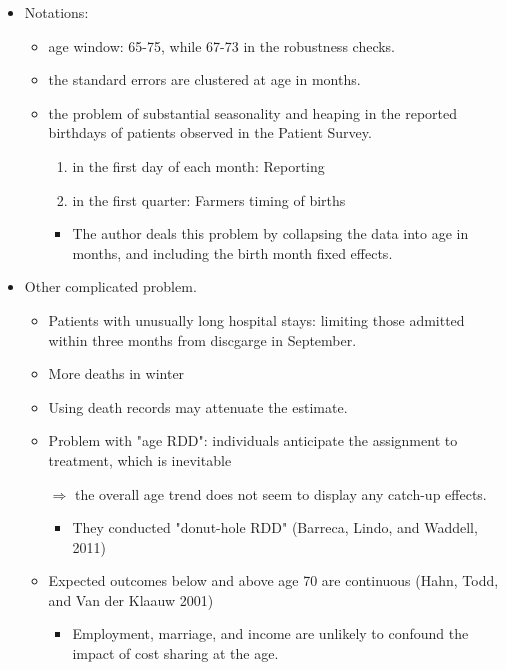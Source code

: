 \documentclass[../root]{subfiles}
\begin{document}
    \begin{itemize}
      \item Notations:
      \begin{itemize}
        \item age window: 65-75, while 67-73 in the robustness checks.
        \item the standard errors are clustered at age in months.
        \item the problem of substantial seasonality and heaping in the reported birthdays of patients observed in the Patient Survey.
        \begin{enumerate}
          \item in the first day of each month: Reporting
          \item in the first quarter: Farmers timing of births
        \end{enumerate}
        \begin{itemize}
          \item The author deals this problem by collapsing the data into age in months, and including the birth month fixed effects.
        \end{itemize}
      \end{itemize}
      \item Other complicated problem.
      \begin{itemize}
        \item Patients with unusually long hospital stays: limiting those admitted within three months from discgarge in September.
        \item More deaths in winter
        \item Using death records may attenuate the estimate.
        \item Problem with "age RDD": individuals anticipate the assignment to treatment, which is inevitable

        $\Rightarrow$ the overall age trend does not seem to display any catch-up effects.
        \begin{itemize}
          \item They conducted "donut-hole RDD" (Barreca, Lindo, and Waddell, 2011)
        \end{itemize}
        \item Expected outcomes below and above age 70 are continuous (Hahn, Todd, and Van der Klaauw 2001)
        \begin{itemize}
          \item Employment, marriage, and income are unlikely to confound the impact of cost sharing at the age.
        \end{itemize}
      \end{itemize}
    \end{itemize}
\end{document}
